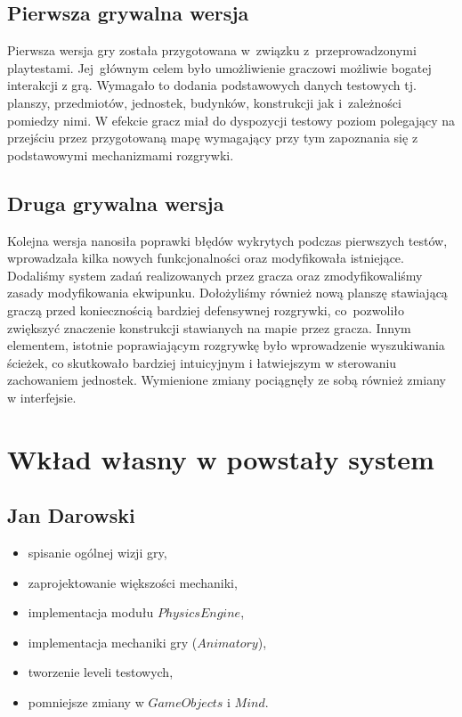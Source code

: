 \documentclass[licencjacka]{pracamgr}
\begin{document}
  \section{Pierwsza grywalna wersja}
  Pierwsza wersja gry została przygotowana w~związku z~przeprowadzonymi playtestami. Jej~głównym celem było
  umożliwienie graczowi możliwie bogatej interakcji z grą. Wymagało to dodania podstawowych
  danych testowych tj. planszy, przedmiotów, jednostek, budynków, konstrukcji jak i~zależności pomiedzy nimi.
  W efekcie gracz miał do dyspozycji testowy poziom polegający na przejściu przez przygotowaną mapę wymagający
  przy tym zapoznania się z podstawowymi mechanizmami rozgrywki.

  \section{Druga grywalna wersja}
  Kolejna wersja nanosiła poprawki błędów wykrytych podczas pierwszych testów, wprowadzała kilka nowych funkcjonalności
  oraz modyfikowała istniejące. Dodaliśmy system zadań realizowanych przez gracza oraz zmodyfikowaliśmy zasady modyfikowania
  ekwipunku. Dołożyliśmy również nową planszę stawiającą graczą przed koniecznością bardziej defensywnej rozgrywki,
  co~pozwoliło zwiększyć znaczenie konstrukcji stawianych na mapie przez gracza. Innym elementem, istotnie poprawiającym
  rozgrywkę było wprowadzenie wyszukiwania ścieżek, co skutkowało bardziej intuicyjnym i łatwiejszym w sterowaniu
  zachowaniem jednostek. Wymienione zmiany pociągnęły ze sobą również zmiany w interfejsie.

\chapter{Wkład własny w powstały system}

  \section{Jan Darowski}
  \begin{itemize}
   \item spisanie ogólnej wizji gry,
   \item zaprojektowanie większości mechaniki,
   \item implementacja modułu $PhysicsEngine$,
   \item implementacja mechaniki gry ($Animatory$),
   \item tworzenie leveli testowych,
   \item pomniejsze zmiany w $GameObjects$ i $Mind$.
  \end{itemize}
\end{document}
